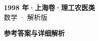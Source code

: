 \documentclass[zihao=-4, a4paper]{ctexart}
\begin{document}
\begin{center}
  {\Large\bfseries 1998 年·上海卷·理工农医类}\\[4pt]
  {\large 数学 · 解析版}
\end{center}
\medskip
{}

\clearpage
{}
\begin{center}{\Large\bfseries 参考答案与详细解析}\end{center}
\medskip

\end{document}
